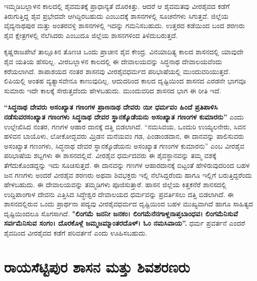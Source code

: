 \vskip -1pt

ಇಮ್ಮಡಿಬಲ್ಲಾಳನ ಕಾಲದಲ್ಲಿ ಶೈವಮತಕ್ಕೆ ಪ್ರಾಧಾನ್ಯತೆ ದೊರಕಿತ್ತು. ಆದರೆ ಆ ಶೈವಮತವು ವೀರಶೈವದ ಕಡೆಗೆ ತಿರುಗುತ್ತಿದ್ದ ಶೈವ ಪ್ರಭೇದವೇ ಆಗಿದ್ದಿರಬಹುದು ಎಂಬುದಕ್ಕೆ ಶಾಸನಗಳಲ್ಲಿ ಸೂಚನೆಗಳು ಸಿಗುತ್ತವೆ. ಜಿಲ್ಲೆಯ ವೈದ್ಯನಾಥಪುರ ಮತ್ತು ಅಂತರವಳ್ಳಿ ಶಾಸನಗಳಲ್ಲಿ ಇದನ್ನು ಗಮನಿಸಬಹುದು. ಉತ್ತರದ ಕಡೆಯಿಂದ ಬಂದ ಶರಣರು ಶೈವ ಕ್ಷೇತ್ರಗಳಲ್ಲಿ ನೆಲೆಸಿದರು ಎಂಬುದೂ ಜಿಲ್ಲೆಯ ಶಾಸನಗಳಿಂದ ತಿಳಿದುಬರುತ್ತದೆ.

\vskip 2pt

ಕೃಷ್ಣರಾಜಪೇಟೆ ತಾಲ್ಲೂಕಿನ ತೊಣಚಿ ಒಂದು ಪ್ರಾಚೀನ ಶೈವ ಕೇಂದ್ರ. ವಿನಯಾದಿತ್ಯ ಕಾಲದ ಶಾಸನದಲ್ಲಿ ಯಾವುದೇ ಶೈವ ಯತಿಯ ಹೆಸರಿಲ್ಲ. ವೀರಬಲ್ಲಾಳನ ಕಾಲದಲ್ಲಿ ಈ ದೇವಾಲಯವನ್ನು ಸಿದ್ಧನಾಥ ದೇವಾಲಯವೆಂದು ಕರೆಯಲಾಗಿದೆ. ಶಾಪಾಶಯದ ನಂತರ ಶಾಸನವು ವೀರಶೈವಧರ್ಮದ ಪರಿಭಾಷೆಯಲ್ಲಿ ಮುಂದುವರಿಯುತ್ತದೆ. ಲಿಪಿಯಲ್ಲಿ ಅಂತಹ ವ್ಯತ್ಯಾಸವೇನೂ ಕಾಣುವುದಿಲ್ಲ. ಆದುದರಿಂದ ಕಾಲದ ದೃಷ್ಟಿಯಿಂದ ಶಾಸನದ ಎರಡನೇ ಭಾಗವೂ ಸುಮಾರು ಇದೇ ಕಾಲಕ್ಕೆ ಸೇರುತ್ತದೆಂದು ಹೇಳಬಹುದು. ಮುಂದುವರಿದ ಶಾಸನದ ಭಾಗ ಈ ರೀತಿ ಇದೆ.

\textbf{“ಸಿದ್ಧನಾಥ ದೇವರು ಅಸಂಖ್ಯಾತ ಗಣಂಗಳ ಪ್ರಾಣನಾಥ ದೇವರು ಯೀ ಧರ್ಮವಂ ಹಿಂದೆ ಪ್ರತಿಪಾಳಿಸಿ\general{\break } ನಡೆಸುವರಸಂಖ್ಯಾತ ಗಣಂಗಳು ಸಿದ್ಧನಾಥ ದೇವರ ಸ್ಥಾನಕ್ಕೊಡೆಯನು ಅಸಂಖ್ಯಾತ ಗಣಂಗಳ ಕುಮಾರನು”} ಎಂದು ಉಲ್ಲೇಖಿಸಿದ ನಂತರ, ಗಣಗಳ ಆಹಾರ ದಾನಕ್ಕೆ ದತ್ತಿ ಬಿಡಲಾಗಿದೆ. “ನಮಸಿವಯ, ಒಂದುರಿ ಉಯ್ಯಲನೇರು, ಸಿವನ ಹಳಿವನ ಬಾಯೊಳು, ಲೋಕೋದ್ಭವರು ಮ್ರಿಡನ ಮನೆಯವಂ ಗಡ, ಪಿಂಡಾಂಡದಾನ, ಈ ದಾನವನ್ನು ಪಾಲಿಸುವರು ಅಸಂಖ್ಯಾತ ಗಣಂಗಳು, ಸಿದ್ಧನಾಥ ದೇವರ ಸ್ಥಾನಕ್ಕೊಡೆಯನು ಅಸಂಖ್ಯಾತ ಗಣಂಗಳ ಕುಮಾರನು” ಎಂಬ ವೀರಶೈವ ಪರಿಭಾಷೆಯ ಶಬ್ದಗಳು ಈ ಶಾಸನದಲ್ಲಿವೆ. ವೀರಶೈವ ಧರ್ಮದವರು ಈ ಶೈವಸ್ಥಾನವನ್ನು ತಮ್ಮ ವಶಕ್ಕೆ ತೆಗೆದುಕೊಂಡದ್ದನ್ನು ಇದು ಸೂಚಿಸುತ್ತದೆ. ಈ ದಾನವನ್ನು ಗಣಗಳ ಆಹಾರದಾನಕ್ಕೆ ಬಿಟ್ಟಂತೆ ಹೇಳಿರುವುದರಿಂದ ಬಹಳ ಜನ ಗಣಗಳು ಅಂದರೆ ವೀರಶೈವ ಶರಣರು ಅಥವಾ ಶಿವಭಕ್ತರು ಇಲ್ಲಿ ನೆಲೆಸಿದ್ದರೆಂದು ಹಾಗೂ ಇಲ್ಲಿಗೆ ಬರುತ್ತಿದ್ದರೆಂದು ಹೇಳಬಹುದು. ಈ ದೇವಾಲಯವನ್ನು ತಮ್ಮಡಿಗಳು ಪೂಜಿಸುತ್ತಾರೆ. ಹಾಸನ ಜಿಲ್ಲೆಯ ಕಿತ್ತಕನೆರೆ ಶಾನಸದಲ್ಲಿ ಉದ್ದಿಪಾಂಗಾಳ ದೇವನು ಎತ್ತಿಸಿದ ಸಿದ್ಧೇಶ್ವರ ದೇವಾಲಯದ ಧರ್ಮವನ್ನು ಪ್ರವರ್ತಿಸಲು ದತ್ತಿ ಬಿಡಲಾಗಿದೆ. ಈ ಶಾಸನದಲ್ಲಿರುವ ಒಂದು ಪ್ರಾರ್ಥನಾ ಪದ್ಯವು ವೀರಶೈವಧರ್ಮದ ದೃಷ್ಟಿಯಿಂದ ಬಹಳ ಮುಖ್ಯವಾಗಿದೆ ಹಾಗೂ ಸಾಹಿತ್ಯದ ದೃಷ್ಟಿಯಿಂದಲೂ ಸೊಗಸಾಗಿದೆ. \textbf{"ಲಿಂಗಮೆ ಜನನೀ ಜನಕಂ। ಲಿಂಗಮೆನೆನಗಾಳ್ದನಾಪ್ತಬಾಂಧವ। ಲಿಂಗಮೆನಿಸುವೆ ಸರ್ವಮೆನಿಸುವ ಸಂಗಂ। ದೊರಕೊಳ್ಗೆ ಜಮ್ಮಜಮ್ಮಾಂತರದೊಳ್​। ಓಂ ನಮಸಿವಾಯ”. }ಧರ್ಮ ಪ್ರವರ್ತನೆ ಎಂದರೆ ಶೈವದಿಂದ ವೀರಶೈವದ ಕಡೆಗೆ ಪರಿವರ್ತನೆ ಎಂದು ಊಹಿಸಬಹುದು.


\section*{ರಾಯಸೆಟ್ಟಿಪುರ ಶಾಸನ ಮತ್ತು ಶಿವಶರಣರು}

